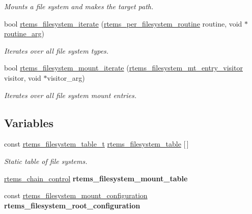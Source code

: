 \begin{DoxyCompactItemize}
\begin{DoxyCompactList}\small\item\em Mounts a file system and makes the {\itshape target} path. \end{DoxyCompactList}\item 
bool \mbox{\hyperlink{group__FileSystemTypesAndMount_ga27b530006418803c3888d8bfd1c3949a}{rtems\+\_\+filesystem\+\_\+iterate}} (\mbox{\hyperlink{group__FileSystemTypesAndMount_gaa40c0b8e4e5abe60a08bead5b3c72241}{rtems\+\_\+per\+\_\+filesystem\+\_\+routine}} routine, void $\ast$\mbox{\hyperlink{structroutine__arg}{routine\+\_\+arg}})
\begin{DoxyCompactList}\small\item\em Iterates over all file system types. \end{DoxyCompactList}\item 
bool \mbox{\hyperlink{group__FileSystemTypesAndMount_ga0b6051a3ebc57b6b7c37bcfa2132b66f}{rtems\+\_\+filesystem\+\_\+mount\+\_\+iterate}} (\mbox{\hyperlink{group__FileSystemTypesAndMount_ga84a7a5cd36614b906e1c485224beb686}{rtems\+\_\+filesystem\+\_\+mt\+\_\+entry\+\_\+visitor}} visitor, void $\ast$visitor\+\_\+arg)
\begin{DoxyCompactList}\small\item\em Iterates over all file system mount entries. \end{DoxyCompactList}\end{DoxyCompactItemize}
\subsection*{Variables}
\begin{DoxyCompactItemize}
\item 
const \mbox{\hyperlink{structrtems__filesystem__table__t}{rtems\+\_\+filesystem\+\_\+table\+\_\+t}} \mbox{\hyperlink{group__FileSystemTypesAndMount_ga752ec6b29e7d936b663d74eff727f0ca}{rtems\+\_\+filesystem\+\_\+table}} \mbox{[}$\,$\mbox{]}
\begin{DoxyCompactList}\small\item\em Static table of file systems. \end{DoxyCompactList}\item 
\mbox{\label{group__FileSystemTypesAndMount_ga9297e0ca02f513014e2f71c5d919a0a2}} 
\mbox{\hyperlink{unionChain__Control}{rtems\+\_\+chain\+\_\+control}} {\bfseries rtems\+\_\+filesystem\+\_\+mount\+\_\+table}
\item 
\mbox{\label{group__FileSystemTypesAndMount_ga37d0fc1653797a1c833bb0f2f3615acd}} 
const \mbox{\hyperlink{structrtems__filesystem__mount__configuration}{rtems\+\_\+filesystem\+\_\+mount\+\_\+configuration}} {\bfseries rtems\+\_\+filesystem\+\_\+root\+\_\+configuration}
\end{DoxyCompactItemize}
